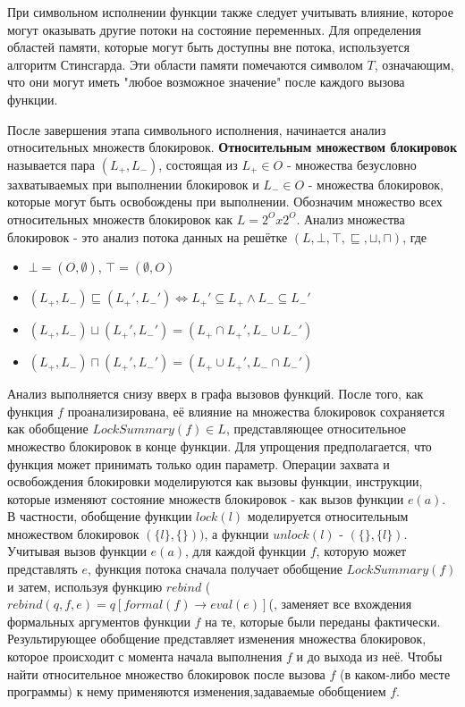 При символьном исполнении функции также следует учитывать влияние, которое могут оказывать другие потоки на состояние переменных. Для определения областей памяти, которые могут быть доступны вне потока, используется алгоритм Стинсгарда. Эти области памяти помечаются символом $T$, означающим, что они могут иметь "любое возможное значение" после каждого вызова функции.

После завершения этапа символьного исполнения, начинается анализ относительных множеств блокировок. \textbf{Относительным множеством блокировок} называется пара $(L_{+}, L_{-})$, состоящая из $L_{+} \in O$ - множества безусловно захватываемых при выполнении блокировок и $L_{-} \in O$ - множества блокировок, которые могут быть освобождены при выполнении. Обозначим множество всех относительных множеств блокировок как $L = 2^{O} x 2^{O}$. Анализ множества блокировок - это анализ потока данных на решётке $(L, \bot, \top, \sqsubseteq, \sqcup, \sqcap)$, где
\begin{itemize}
\item $\bot = (O, \emptyset)$, $\top = (\emptyset, O)$
\item $(L_{+}, L_{-}) \sqsubseteq (L_{+}', L_{-}') \Longleftrightarrow L_{+}' \subseteq L_{+} \wedge L_{-} \subseteq L_{-}'$
\item $(L_{+}, L_{-}) \sqcup (L_{+}', L_{-}') = (L_{+} \cap L_{+}', L_{-} \cup L_{-}')$
\item $(L_{+}, L_{-}) \sqcap (L_{+}', L_{-}') = (L_{+} \cup L_{+}', L_{-} \cap L_{-}')$
\end{itemize}

Анализ выполняется снизу вверх в графа вызовов функций. После того, как функция $f$ проанализирована, её влияние на множества блокировок сохраняется как обобщение $LockSummary(f) \in L$, представляющее относительное множество блокировок в конце функции. Для упрощения предполагается, что функция может принимать только один параметр. Операции захвата и освобождения блокировки моделируются как вызовы функции, инструкции, которые изменяют состояние множеств блокировок - как вызов функции $e(a)$. В частности, обобщение функции $lock(l)$ моделируется относительным множеством блокировок $(\{l\}, \{\}))$, а фукнции $unlock(l)$ - $(\{\}, \{l\})$. Учитывая вызов функции $e(a)$, для каждой функции $f$, которую может представлять $e$, функция потока сначала получает обобщение $LockSummary(f)$ и затем, используя функцию $rebind$ ($rebind(q, f, e) = q[formal(f ) → eval(e)]$(, заменяет все вхождения формальных аргументов функции $f$ на те, которые были переданы фактически. Результирующее обобщение представляет изменения множества блокировок, которое происходит с момента начала выполнения $f$ и до выхода из неё. Чтобы найти относительное множество блокировок после вызова $f$ (в каком-либо месте программы) к нему применяются изменения,задаваемые обобщением $f$.

